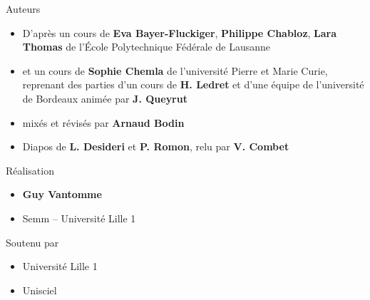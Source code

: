 \begin{frame}
\begin{minipage}{0.90\textwidth}
   \smallskip
   
  Auteurs
  \begin{itemize}
  \item D'après un cours de {\bf Eva Bayer-Fluckiger}, {\bf Philippe Chabloz}, {\bf Lara Thomas}
  de l'\'Ecole Polytechnique Fédérale de Lausanne

  \item et un cours de {\bf Sophie Chemla} de l'université Pierre et Marie Curie,  
  reprenant des parties d'un cours de {\bf H. Ledret} et d'une équipe de l'université de 
  Bordeaux animée par {\bf J. Queyrut}
  
  \item mixés et révisés par {\bf Arnaud Bodin}  
  
  \item Diapos de {\bf L. Desideri} et {\bf P. Romon}, relu par {\bf V. Combet} 
    
  \end{itemize}

  \smallskip

  Réalisation
  \begin{itemize}
    \item {\bf Guy Vantomme}
    \item Semm -- Université Lille 1
  \end{itemize}

  \smallskip

  Soutenu par 
  \begin{itemize}
    \item Université Lille 1
    \item Unisciel
  \end{itemize}

  \end{minipage}  



\end{frame}


